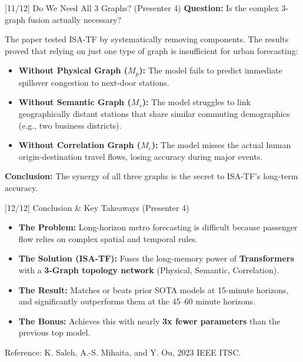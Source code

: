 \documentclass[aspectratio=169]{beamer}
\begin{document}
\begin{frame}{[11/12] Do We Need All 3 Graphs? (Presenter 4)}
  \hypertarget{sec:discussion}{}
  \textbf{Question:} Is the complex 3-graph fusion actually necessary?
  
  \vspace{0.2cm}
  The paper tested ISA-TF by systematically removing components. The results proved that relying on just one type of graph is insufficient for urban forecasting:
  
  \begin{itemize}
    \item \textbf{Without Physical Graph ($M_p$):} The model fails to predict immediate spillover congestion to next-door stations.
    \item \textbf{Without Semantic Graph ($M_s$):} The model struggles to link geographically distant stations that share similar commuting demographics (e.g., two business districts).
    \item \textbf{Without Correlation Graph ($M_c$):} The model misses the actual human origin-destination travel flows, losing accuracy during major events.
  \end{itemize}
  
  \vspace{0.2cm}
  \textbf{\color{plumNight}Conclusion:} The synergy of all three graphs is the secret to ISA-TF's long-term accuracy.
\end{frame}

\begin{frame}{[12/12] Conclusion \& Key Takeaways (Presenter 4)}
  \begin{itemize}
    \item \textbf{The Problem:} Long-horizon metro forecasting is difficult because passenger flow relies on complex spatial and temporal rules.
    \item \textbf{The Solution (ISA-TF):} Fuses the long-memory power of \textbf{Transformers} with a \textbf{3-Graph topology network} (Physical, Semantic, Correlation).
    \item \textbf{The Result:} Matches or beats prior SOTA models at 15-minute horizons, and significantly outperforms them at the 45--60 minute horizons.
    \item \textbf{The Bonus:} Achieves this with nearly \textbf{3x fewer parameters} than the previous top model.
  \end{itemize}
  
  \vspace{0.6em}
  \small Reference: K. Saleh, A.-S. Mihaita, and Y. Ou, 2023 IEEE ITSC.
\end{frame}
\end{document}

